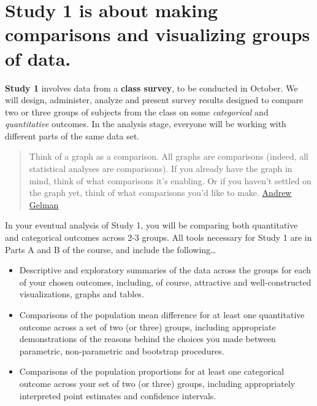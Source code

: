 \documentclass[]{book}
\providecommand{\tightlist}{%
  \setlength{\itemsep}{0pt}\setlength{\parskip}{0pt}}
\theoremstyle{definition}
\theoremstyle{definition}
\theoremstyle{definition}
\theoremstyle{remark}
\begin{document}
\hypertarget{study-1-is-about-making-comparisons-and-visualizing-groups-of-data.}{%
\section{Study 1 is about making comparisons and visualizing groups of
data.}\label{study-1-is-about-making-comparisons-and-visualizing-groups-of-data.}}

\textbf{Study 1} involves data from a \textbf{class survey}, to be
conducted in October. We will design, administer, analyze and present
survey results designed to compare two or three groups of subjects from
the class on some \emph{categorical} and \emph{quantitative} outcomes.
In the analysis stage, everyone will be working with different parts of
the same data set.

\begin{quote}
Think of a graph as a comparison. All graphs are comparisons (indeed,
all statistical analyses are comparisons). If you already have the graph
in mind, think of what comparisons it's enabling. Or if you haven't
settled on the graph yet, think of what comparisons you'd like to make.
\href{http://andrewgelman.com/2014/03/25/statistical-graphics-course-statistical-graphics-advice/}{Andrew
Gelman}
\end{quote}

In your eventual analysis of Study 1, you will be comparing both
quantitative and categorical outcomes across 2-3 groups. All tools
necessary for Study 1 are in Parts A and B of the course, and include
the following\ldots{}

\begin{itemize}
\tightlist
\item
  Descriptive and exploratory summaries of the data across the groups
  for each of your chosen outcomes, including, of course, attractive and
  well-constructed visualizations, graphs and tables.
\item
  Comparisons of the population mean difference for at least one
  quantitative outcome across a set of two (or three) groups, including
  appropriate demonstrations of the reasons behind the choices you made
  between parametric, non-parametric and bootstrap procedures.
\item
  Comparisons of the population proportions for at least one categorical
  outcome across your set of two (or three) groups, including
  appropriately interpreted point estimates and confidence intervals.
\end{itemize}
\end{document}
